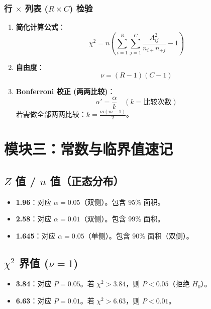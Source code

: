 \documentclass[lang=cn,10pt]{elegantbook}
\begin{document}
\subsubsection{行 $\times$ 列表 ($R \times C$) 检验}
\begin{enumerate}
    \item \textbf{简化计算公式}：
    \[ \chi^2 = n \left( \sum_{i=1}^{R} \sum_{j=1}^{C} \frac{A_{ij}^2}{n_{i+} n_{+j}} - 1 \right) \]
    \item \textbf{自由度}：
    \[ \nu = (R-1)(C-1) \]
    \item \textbf{Bonferroni 校正 (两两比较)}：
    \[ \alpha' = \frac{\alpha}{k} \quad (k = \text{比较次数}) \]
    若需做全部两两比较：$k = \frac{m(m-1)}{2}$。
\end{enumerate}



\section{模块三：常数与临界值速记}

\subsection{$Z$ 值 / $u$ 值（正态分布）}
\begin{itemize}
    \item \textbf{1.96}：对应 $\alpha=0.05$（双侧）。包含 95\% 面积。
    \item \textbf{2.58}：对应 $\alpha=0.01$（双侧）。包含 99\% 面积。
    \item \textbf{1.645}：对应 $\alpha=0.05$（单侧）。包含 90\% 面积（双侧）。
\end{itemize}

\subsection{$\chi^2$ 界值 ($\nu=1$)}
\begin{itemize}
    \item \textbf{3.84}：对应 $P=0.05$。若 $\chi^2 > 3.84$，则 $P<0.05$（拒绝 $H_0$）。
    \item \textbf{6.63}：对应 $P=0.01$。若 $\chi^2 > 6.63$，则 $P<0.01$。
\end{itemize}
\end{document}
